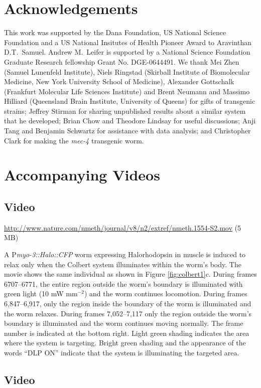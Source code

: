 \section{Acknowledgements}
This work was supported by the Dana Foundation, US National Science Foundation and a US National Insitutes of Health Pioneer Award to Aravinthan D.T.~Samuel. Andrew M.~Leifer is supported by a National Science Foundation Graduate Research fellowship Grant No. DGE-0644491. We thank Mei Zhen (Samuel Lunenfeld Institute), Niels Ringstad (Skirball Institute of Biomolecular Medicine, New York University School of Medicine), Alexander Gottschalk (Frankfurt Molecular Life Sciences Institute) and Brent Neumann and Massimo Hilliard (Queensland Brain Institute, University of Queens) for gifts of transgenic strains; Jeffrey Stirman for sharing unpublished results about a similar system that he developed; Brian Chow and Theodore Lindsay for useful discussions; Anji Tang and Benjamin Schwartz for assistance with data analysis; and Christopher Clark for making the \textit{mec-4} transgenic worm.


\section{Accompanying Videos}
\subsection{Video}\label{movie:colbert1} %
\url{http://www.nature.com/nmeth/journal/v8/n2/extref/nmeth.1554-S2.mov} (5 MB)

A P\textit{myo-3::Halo::CFP} worm expressing Halorhodopsin in muscle is induced to relax only when the Colbert system illuminates within the worm's body. The movie shows the same individual as shown in Figure \ref{fig:colbert1}c. During frames 6707–6771, the entire region outside the worm's boundary is illuminated with green light (10 mW mm$^{−2}$) and the worm continues locomotion. During frames 6,847–6,917, only the region inside the boundary of the worm is illuminated and the worm relaxes. During frames 7,052–7,117 only the region outside the worm's boundary is illuminated and the worm continues moving normally. The frame number is indicated at the bottom right. Light green shading indicates the area where the system is targeting. Bright green shading and the appearance of the words “DLP ON” indicate that the system is illuminating the targeted area.

\subsection{Video}\label{movie:colbert2} %

